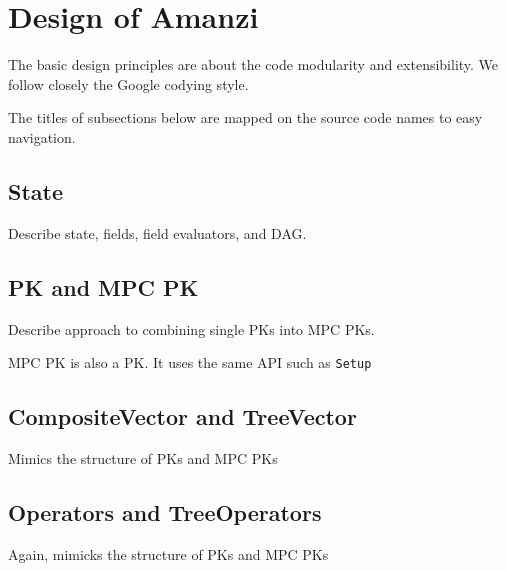 %
%

\section{Design of Amanzi}

The basic design principles are about the code modularity and extensibility.
We follow closely the Google codying style.

The titles of subsections below are mapped on the source code names
to easy navigation.


\subsection{State}

Describe state, fields, field evaluators, and DAG.


\subsection{PK and MPC PK}

Describe approach to combining single PKs into MPC PKs.

MPC PK is also a PK.
It uses the same API such as {\tt Setup}


\subsection{CompositeVector and TreeVector}

Mimics the structure of PKs and MPC PKs


\subsection{Operators and TreeOperators}

Again, mimicks the structure of PKs and MPC PKs

